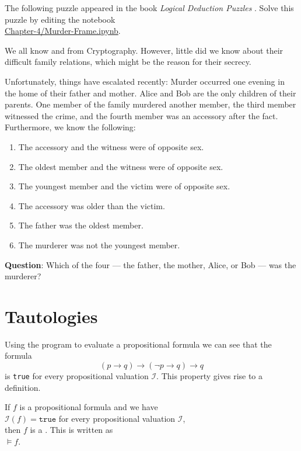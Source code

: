 \exerciseEng
The following puzzle appeared in the book \emph{Logical Deduction Puzzles} \cite{summers:2006}.
Solve this puzzle by editing the notebook
\\[0.2cm]
\hspace*{1.3cm}
\href{https://github.com/karlstroetmann/Logic/blob/master/TypeScript/Chapter-4/Murder-Frame.ipynb}{Chapter-4/Murder-Frame.ipynb}.

\begin{center}
\begin{minipage}{0.95\linewidth}
We all know  and  from Cryptography.  However, little did
we know about their difficult family relations, which might be the reason for
their secrecy.  

Unfortunately, things have escalated recently:
Murder occurred one evening in the home of their father and mother.  Alice and Bob are the only children of
their parents. One member of the family murdered another member, the third member witnessed the crime, and the
fourth member was an accessory after the fact.  Furthermore, we know the following: 
\begin{enumerate}
\item The accessory and the witness were of opposite sex.
\item The oldest member and the witness were of opposite sex.
\item The youngest member and the victim were of opposite sex.
\item The accessory was older than the victim.
\item The father was the oldest member.
\item The murderer was not the youngest member.
\end{enumerate}
\textbf{Question}: Which of the four --- the father, the mother, Alice, or Bob --- was the murderer?
\eox
\end{minipage} 
\end{center}

\section{Tautologies}
Using the program to evaluate a propositional formula we can see that the formula
$$  (p \rightarrow q) \rightarrow (\neg p \rightarrow q) \rightarrow q $$
is \texttt{true} for every propositional valuation $\mathcal{I}$.  This property gives rise to a definition.

\begin{Definition}[Tautology]
  If $f$ is a propositional formula and we have
  \\[0.2cm]
  \hspace*{1.3cm}
  $\mathcal{I}(f) = \texttt{true}$ \quad for every propositional valuation $\mathcal{I}$, \\[0.2cm]
  then $f$ is a  .  This is written as \\[0.2cm]
  \hspace*{1.3cm} $\models f$.
  \eox
\end{Definition}

